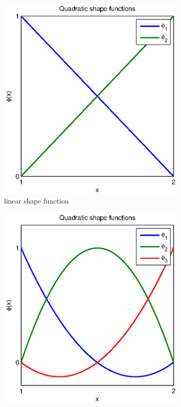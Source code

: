 \documentclass[paper=a4, fontsize=11pt]{article} %
\begin{document}
\begin{figure}
        \centering
        \begin{subfigure}[b]{0.6\textwidth}
                \includegraphics[width=\textwidth]{linear_shape_function.eps}
                \caption{linear shape function}
                \label{fig:linear_shape}
        \end{subfigure}%
        \begin{subfigure}[b]{0.6\textwidth}
                \includegraphics[width=\textwidth]{quadratic_shape_function.eps}

\end{subfigure}
\end{figure}
\end{document}
